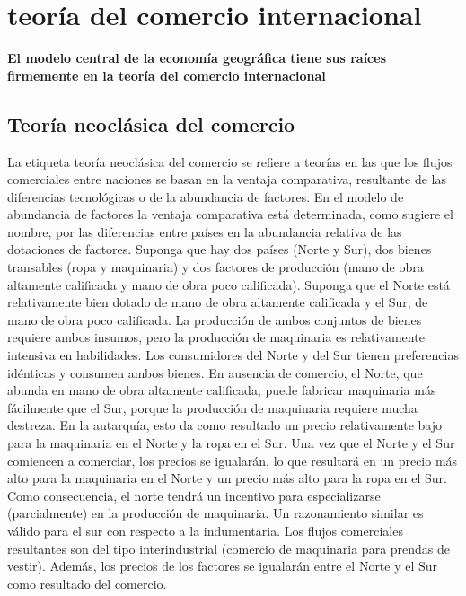 \section{teoría del comercio internacional}
\textbf{El modelo central de la economía geográfica tiene sus raíces firmemente en la teoría del comercio internacional}

\subsection{Teoría neoclásica del comercio}
La etiqueta teoría neoclásica del comercio se refiere a teorías en las que los flujos comerciales entre naciones se basan en la ventaja comparativa, resultante de las diferencias tecnológicas o de la abundancia de factores. En el modelo de abundancia de factores la ventaja comparativa está determinada, como sugiere el nombre, por las diferencias entre países en la abundancia relativa de las dotaciones de factores. Suponga que hay dos países (Norte y Sur), dos bienes transables (ropa y maquinaria) y dos factores de producción (mano de obra altamente calificada y mano de obra poco calificada). Suponga que el Norte está relativamente bien dotado de mano de obra altamente calificada y el Sur, de mano de obra poco calificada. La producción de ambos conjuntos de bienes requiere ambos insumos, pero la producción de maquinaria es relativamente intensiva en habilidades. Los consumidores del Norte y del Sur tienen preferencias idénticas y consumen ambos bienes. En ausencia de comercio, el Norte, que abunda en mano de obra altamente calificada, puede fabricar maquinaria más fácilmente que el Sur, porque la producción de maquinaria requiere mucha destreza. En la autarquía, esto da como resultado un precio relativamente bajo para la maquinaria en el Norte y la ropa en el Sur. Una vez que el Norte y el Sur comiencen a comerciar, los precios se igualarán, lo que resultará en un precio más alto para la maquinaria en el Norte y un precio más alto para la ropa en el Sur. Como consecuencia, el norte tendrá un incentivo para especializarse (parcialmente) en la producción de maquinaria. Un razonamiento similar es válido para el sur con respecto a la indumentaria. Los flujos comerciales resultantes son del tipo interindustrial (comercio de maquinaria para prendas de vestir). Además, los precios de los factores se igualarán entre el Norte y el Sur como resultado del comercio.
